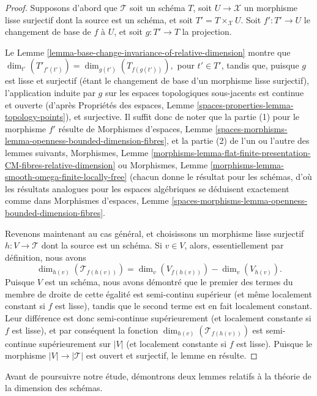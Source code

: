 \begin{proof}
Supposons d'abord que $\mathcal{T}$ soit un schéma $T$,
soit $U \to \mathcal{X}$ un morphisme lisse surjectif dont la source
est un schéma, et soit $T' = T \times_{\mathcal{X}} U$.
Soit $f': T' \to U$ le changement de base de $f$ à $U$,
et soit $g: T' \to T$ la projection.

\medskip\noindent
Le Lemme \ref{lemma-base-change-invariance-of-relative-dimension}
montre que $\dim_{t'}(T'_{f'(t')}) = \dim_{g(t')}(T_{f(g(t'))}),$
pour $t' \in T'$, tandis que,
puisque $g$ est lisse et surjectif (étant le changement de base
d'un morphisme lisse surjectif), l'application induite par $g$ sur les espaces
topologiques sous-jacents est continue et ouverte
(d'après
Propriétés des espaces, Lemme \ref{spaces-properties-lemma-topology-points}), et
surjective. Il suffit donc de noter que la partie (1) pour le morphisme $f'$
résulte de
Morphismes d'espaces, Lemme
\ref{spaces-morphisms-lemma-openness-bounded-dimension-fibres}, et la partie (2)
de l'un ou l'autre des lemmes suivants, Morphismes, Lemme
\ref{morphisms-lemma-flat-finite-presentation-CM-fibres-relative-dimension}
ou
Morphismes, Lemme \ref{morphisms-lemma-smooth-omega-finite-locally-free}
(chacun donne le résultat pour les schémas, d'où
les résultats analogues pour les espaces algébriques se
déduisent exactement comme dans
Morphismes d'espaces, Lemme
\ref{spaces-morphisms-lemma-openness-bounded-dimension-fibres}.

\medskip\noindent
Revenons maintenant au cas général,
et choisissons un morphisme lisse surjectif
$h:V \to \mathcal{T}$ dont la source est un schéma.
Si $v \in V$, alors, essentiellement par définition,
nous avons
$$
\dim_{h(v)}(\mathcal{T}_{f(h(v))}) =
\dim_{v}(V_{f(h(v))}) - \dim_{v}(V_{h(v)}).
$$
Puisque $V$ est un schéma, nous avons démontré que le premier
des termes du membre de droite de cette égalité
est semi-continu supérieur (et même localement
constant si $f$ est lisse), tandis que le second terme est
en fait localement constant.
Leur différence est donc semi-continue supérieurement
(et localement constante si $f$ est lisse),
et par conséquent la fonction
$\dim_{h(v)}(\mathcal{T}_{f(h(v))})$
est semi-continue supérieurement sur $|V|$ (et localement
constante si $f$ est lisse).
Puisque le morphisme $|V| \to |\mathcal{T}|$ est ouvert et surjectif,
le lemme en résulte.
\end{proof}

\noindent
Avant de poursuivre notre étude,
démontrons deux lemmes relatifs à la théorie de la dimension des schémas.

